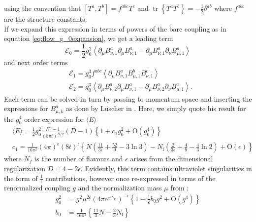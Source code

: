 \documentclass[a4paper,10pt]{article}
\begin{document}
using the convention that $\left[T^{a}, T^{b}\right]=f^{a b c} T^{c}$ and $\operatorname{tr}\left\{T^{a} T^{b}\right\}=-\frac{1}{2} \delta^{a b}$ where $f^{a b c}$ are the structure constants.\\If we expand this expression in terms of powers of the bare coupling as in equation \eqref{eq:flow_g_0expansion}, we get a leading term
\begin{equation}
\mathcal{E}_{0}=\frac{1}{2} g_{0}^{2}\left\langle\partial_{\mu} B_{\nu, 1}^{a} \partial_{\mu} B_{\nu, 1}^{a}-\partial_{\mu} B_{\nu, 1}^{a} \partial_{\nu} B_{\mu, 1}^{a}\right\rangle
\end{equation}
and next order terms
\begin{equation}
\begin{aligned}
&\mathcal{E}_{1}=g_{0}^{3} f^{a b c}\left\langle\partial_{\mu} B_{\nu, 1}^{a} B_{\mu, 1}^{b} B_{\nu, 1}^{c}\right\rangle \\
&\mathcal{E}_{2}=g_{0}^{3}\left\langle\partial_{\mu} B_{\nu, 2}^{a} \partial_{\mu} B_{\nu, 1}^{a}-\partial_{\mu} B_{\nu, 2}^{a} \partial_{\nu} B_{\mu, 1}^{a}\right\rangle.
\end{aligned}
\end{equation}
Each term can be solved in turn by passing to momentum space and inserting the expressions for $B_{\mu,k}^a$ as done by Lüscher in \cite{Luscher2010}. Here, we simply quote his result for the $g_0^4$ order expression for $\langle E \rangle$
\begin{equation}
\begin{aligned}
&\langle E\rangle=\frac{1}{2} g_{0}^{2} \frac{N^{2}-1}{(8 \pi t)^{D / 2}}(D-1)\left\{1+c_{1} g_{0}^{2}+\mathrm{O}\left(g_{0}^{4}\right)\right\} \\
&c_{1}=\frac{1}{16 \pi^{2}}(4 \pi)^{\epsilon}(8 t)^{\epsilon}\left\{N\left(\frac{11}{3 \epsilon}+\frac{52}{9}-3 \ln 3\right)-N_{\mathrm{f}}\left(\frac{2}{3 \epsilon}+\frac{4}{9}-\frac{4}{3} \ln 2\right)+\mathrm{O}(\epsilon)\right\}
\end{aligned}
\end{equation}
where $N_f$ is the number of flavours and $\epsilon$ arises from the dimensional regularization $D=4-2\epsilon$. Evidently, this term contains ultraviolet singularities in the form of $\frac{1}{\epsilon}$ contributions, however once re-expressed in terms of the renormalized coupling $g$ and the normalization mass $\mu$ from \cite{BardeenWilliamA.1978Dsbt}:
\begin{equation}
\begin{aligned}
g_{0}^{2} &=g^{2} \mu^{2 \epsilon}\left(4 \pi \mathrm{e}^{-\gamma_{\mathrm{E}}}\right)^{-\epsilon}\left\{1-\frac{1}{\epsilon} b_{0} g^{2}+\mathrm{O}\left(g^{4}\right)\right\} \\
b_{0} &=\frac{1}{16 \pi^{2}}\left\{\frac{11}{3} N-\frac{2}{3} N_{\mathrm{f}}\right\}
\end{aligned}
\end{equation}
\end{document}
